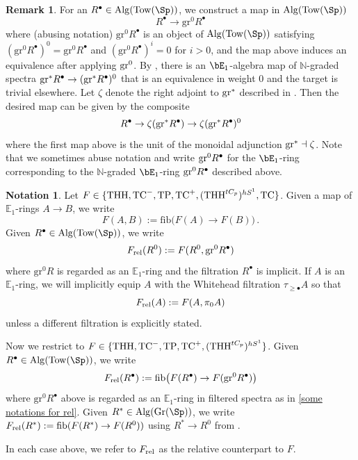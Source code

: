 \documentclass[english,10pt]{amsart}
\theoremstyle{definition}
\newtheorem{nota}{Notation}[section]
\newtheorem{rema}{Remark}[section]
\numberwithin{equation}{section}
\DeclareMathOperator{\TC}{TC}
\newcommand{\ntc}{\mathrm{TC}^{-}}
\DeclareMathOperator{\tp}{\ensuremath{\textup{TP}}}
\DeclareMathOperator{\tc}{\ensuremath{\textup{TC}}}
\DeclareMathOperator{\thh}{\ensuremath{\textup{THH}}}
\newcommand{\Tow}{\mathrm{Tow}}
\newcommand{\Alg}{\mathrm{Alg}}
\newcommand{\N}{\mathbb{N}}
\newcommand{\wtw}{\tau_{\geq \bullet}}
\newcommand{\gr}{\textup{gr}^*}
\newcommand{\grzero}{\textup{gr}^0}
\newcommand{\Gr}{\textup{Gr}}
\begin{document}
\begin{rema}\label{some notations for rel} 
For an  $R^\bullet \in \Alg(\Tow(\Sp))$, we construct a map in $\Alg(\Tow(\Sp))$
\[R^\bullet \to \mathrm{gr}^0R^{\bullet}\]
where (abusing notation)  $\mathrm{gr}^0R^{\bullet}$ is an object of  $\Alg(\Tow(\Sp))$  satisfying $(\mathrm{gr}^0R^{\bullet})^0=\mathrm{gr}^0R^{\bullet}$ and $(\mathrm{gr}^0R^{\bullet})^i=0$ for $i>0$, and the map above induces an equivalence after applying $\grzero$. By \cite[Lemma B.0.6 ()]{hahn2020redshift}, there is an $\bE_1$-algebra map of $\N$-graded  spectra $\gr R^\bullet \to (\gr R^\bullet)^0$ that is an equivalence in weight $0$ and the target is trivial elsewhere. Let $\zeta$ denote the right adjoint to $\gr$ described in  \cite[Remark 3.2.11]{raksit2020hochschild}. Then the desired map can be given by the  composite 
\[R^\bullet \to \zeta (\gr R^\bullet ) \to \zeta (\gr R^\bullet)^0 \]
where the first map above is the unit of the monoidal adjunction $\gr \dashv \zeta$. Note that  we sometimes abuse notation and write $\textup{gr}^0 R^\bullet$ for the $\bE_1$-ring corresponding to the $\N$-graded $\bE_1$-ring $\textup{gr}^0 R^\bullet$ described above. 
\end{rema}

\begin{nota}\label{nota relative versions for filtered rings}
Let 
$F\in \{\thh,\ntc,\tp,\tc^{+}, (\thh^{tC_p})^{hS^1},\TC\}$. 
Given a map of $\mathbb{E}_1$-rings $A\to B$, we write 
\[ F(A,B):=\mathrm{fib}\big(F(A)\to F(B) \big)\,. \]
Given $R^{\bullet} \in \Alg(\Tow(\Sp))$, we write 
\[ F_{\textup{rel}}(R^0):=F(R^0,\grzero R^{\bullet})\]
where $\mathrm{gr}^0R$ is regarded as an $\mathbb{E}_1$-ring and the filtration $R^{\bullet}$ is implicit. If $A$ is an $\mathbb{E}_1$-ring, we will implicitly equip $A$ with the Whitehead filtration $\wtw A$ so that 
\[ F_{\textup{rel}}(A):=F(A,\pi_0A) \]
unless a different filtration is explicitly stated. 
 
Now we restrict to 
$F\in \{\thh,\ntc,\tp,\tc^{+}, (\thh^{tC_p})^{hS^1}\}$.
 Given $R^{\bullet}\in \Alg(\Tow(\Sp))$, we write \[F_{\textup{rel}}(R^{\bullet}):=\mathrm{fib}\big(F(R^{\bullet})\to F(\mathrm{gr}^0R^{\bullet})\big)\]  
 where $\mathrm{gr}^0R^{\bullet}$ above is regarded as an $\mathbb{E}_1$-ring in filtered spectra as in \autoref{some notations for rel}. 
Given $R^*\in \Alg(\Gr(\Sp))$, we write $F_{\textup{rel}}(R^*):=\mathrm{fib}(F(R^*)\to F(R^0))$ using $R^* \to R^0$ from \cite[Lemma B.0.6 ()]{hahn2020redshift}.

In each case above, we refer to $F_{\textup{rel}}$ as the relative counterpart to $F$.
\end{nota}
\end{document}
